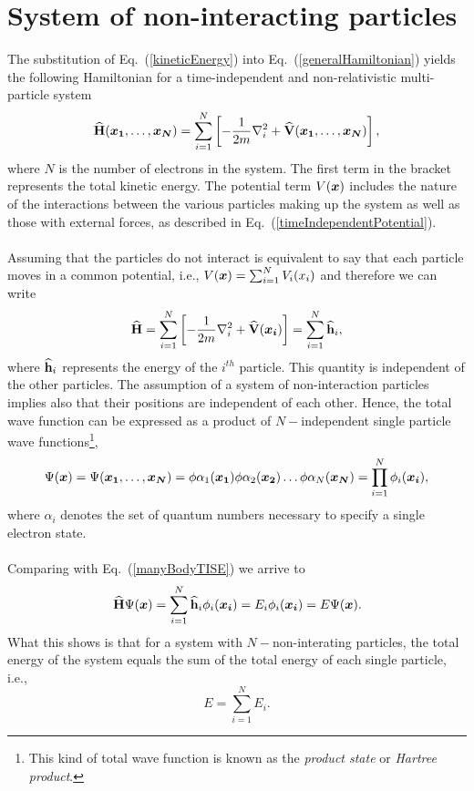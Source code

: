 \section{System of non-interacting particles}\label{nonInteractingParticles}
The substitution of Eq.~(\ref{kineticEnergy}) into  Eq.~(\ref{generalHamiltonian}) yields the following 
Hamiltonian for a time-independent and non-relativistic multi-particle system 
\begin{equation}
 {\bf\widehat{H}}(\boldsymbol{x_1}, \ldots, \boldsymbol{x_N}) = \sum_{i=1}^{N}\left[-\frac{1}{2 m}\nabla_{i}^{2} +  {\bf\widehat{V}}(\boldsymbol{x_1}, \ldots, \boldsymbol{x_N})\right],
\end{equation}
where $N$ is the number of electrons in the system. The first term in the bracket re\-pre\-sents the total kinetic energy. The potential term $V(\boldsymbol{x})$ includes the nature of the interactions between the various particles making up the system as well as those with external forces, as described in  Eq.~(\ref{timeIndependentPotential}).\\
\\
Assuming that the particles do not interact is equivalent to say that each particle moves in a common potential, i.e., $V(\boldsymbol{x}) = \sum_{i=1}^{N} V_i(x_i)$ and therefore we can write   
\begin{equation}\label{HamiltonianSum}
{\bf\widehat{H}} = \sum_{i=1}^{N}\left[-\frac{1}{2 m}\nabla_{i}^{2} +  {\bf\widehat{V}}(\boldsymbol{x_i})\right] =  \sum_{i=1}^{N} {\bf\widehat{h}}_i,
\end{equation}
where ${\bf\widehat{h}}_i$ represents the energy of the $i^{th}$ particle. This quantity is 
independent of the other particles. The assumption of a system of non-interaction particles implies also that their positions are independent of each other. Hence, the total wave function can be expressed as a product of $N-$independent single particle wave functions\footnote{This kind of total wave function is known as the \emph{product state} or \emph{Hartree product}.}\cite{Sherrill,Fitzpatrick,Cramer},
\begin{equation}\label{HartreeProduct}
 \Psi(\boldsymbol{x}) = \Psi(\boldsymbol{x_1},\ldots,\boldsymbol{x_N}) = \phi{\alpha_1}(\boldsymbol{x_1})\phi{\alpha_2}(\boldsymbol{x_2})\ldots \phi{\alpha_N}(\boldsymbol{x_N}) = \prod_{i=1}^{N} \phi_{i}(\boldsymbol{x_i}),
\end{equation}
where $\alpha_i$ denotes the set of quantum numbers necessary to specify a single electron state.\\
\\
Comparing with  Eq.~(\ref{manyBodyTISE}) we arrive to 
\begin{equation}\label{totalHUncorrelatedPart}
{\bf\widehat{H}} \Psi(\boldsymbol{x}) = \sum_{i=1}^{N} {\bf\widehat{h}}_i \phi_i(\boldsymbol{x_i}) = E_i \phi_i(\boldsymbol{x_i}) = E \Psi(\boldsymbol{x}). 
\end{equation}
What this shows is that for a system with $N-$non-interating particles, the total energy of the system equals the sum of the total energy of each single particle, i.e., 
\begin{equation}\label{sumEnergies}
\boxed{E = \sum_{i=1}^{N} E_i.}
\end{equation}


